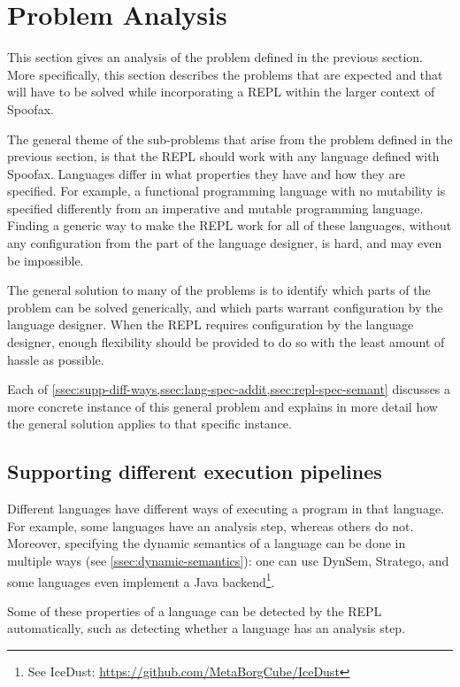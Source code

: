\section{Problem Analysis}
\label{sec:problem-analysis}
This section gives an analysis of the problem defined in the previous
section. More specifically, this section describes the problems that
are expected and that will have to be solved while incorporating a
REPL within the larger context of Spoofax.

The general theme of the sub-problems that arise from the problem
defined in the previous section, is that the REPL should work
with any language defined with Spoofax. Languages differ in what
properties they have and how they are specified. For example, a
functional programming language with no mutability is specified
differently from an imperative and mutable programming
language. Finding a generic way to make the REPL work for all of these
languages, without any configuration from the part of the language
designer, is hard, and may even be impossible.

The general solution to many of the problems is to identify which
parts of the problem can be solved generically, and which parts
warrant configuration by the language designer. When the REPL requires
configuration by the language designer, enough flexibility should be provided
to do so with the least amount of hassle as possible.

Each of \cref{ssec:supp-diff-ways,ssec:lang-spec-addit,ssec:repl-spec-semant}
discusses a more concrete instance of this general problem and
explains in more detail how the general solution applies to that
specific instance.

\subsection{Supporting different execution pipelines}
\label{ssec:supp-diff-ways}
Different languages have different ways of executing a program in that
language. For example, some languages have an analysis step, whereas
others do not. Moreover, specifying the dynamic semantics of a language
can be done in multiple ways (see \cref{ssec:dynamic-semantics}): one
can use DynSem, Stratego, and some languages even implement a Java
backend\footnote{See IceDust:
  \url{https://github.com/MetaBorgCube/IceDust}}.

Some of these properties of a language can be detected by the REPL
automatically, such as detecting whether a language has an analysis step.

